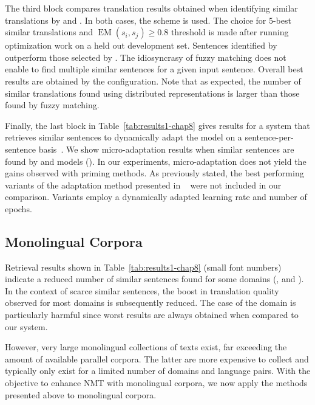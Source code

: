 The third block compares translation results obtained when identifying similar translations by  and . In both cases, the  scheme is used.
The choice for $5$-best similar translations and $\operatorname{EM}(s_i,s_j) \geq 0.8$ threshold is made after running optimization work on a held out development set.
Sentences identified by   outperform those selected by .
The idiosyncrasy of fuzzy matching does not enable to find multiple similar sentences for a given input sentence.
Overall best results are obtained by the  configuration.
Note that as expected, the number of similar translations found using distributed representations is larger than those found by fuzzy matching.

Finally, the last block in Table~\ref{tab:results1-chap8} gives results for a system that retrieves similar sentences to dynamically adapt the model on a sentence-per-sentence basis~\cite{Farajian17multidomain,Li18onesentence}. We show micro-adaptation results when similar sentences are found by  and  models ().
In our experiments, micro-adaptation does not yield the gains observed with priming methods. As previously stated, the best performing variants of the adaptation method presented in ~\citet{Farajian17multidomain} were not included in our comparison. Variants employ a dynamically adapted learning rate and number of epochs. 

\subsection*{Monolingual Corpora}

Retrieval results shown in Table~\ref{tab:results1-chap8} (small font numbers) indicate a reduced number of similar sentences found for some domains (,  and ). 
In the context of scarce similar sentences, the boost in translation quality observed for most domains is subsequently reduced. The case of the  domain is particularly harmful since worst results are always obtained when compared to our  system.

However, very large monolingual collections of texts exist, far exceeding the amount of available parallel corpora. The latter are more expensive to collect and typically only exist for a limited number of domains and language pairs. With the objective to enhance NMT with monolingual corpora, we now apply the methods presented above to monolingual corpora. 

